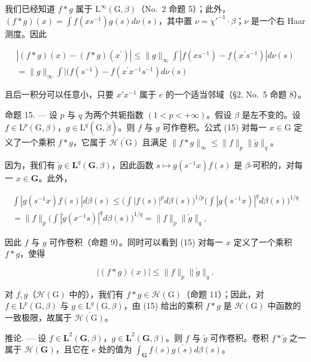 我们已经知道 \(f * g\) 属于 \(\mathrm{L}^{\infty}(\mathrm{G},\beta)\)（No.~2 命题 5）；此外，\((f*g)(x) = \int f(xs^{-1})g(s)d\nu(s)\)，其中置 \(\nu = \chi'^{-1}\cdot \beta\)；\(\nu\) 是一个右 Haar 测度。因此

\[
\begin{array}{c} | (f * g) (x) - (f * g) (x ^ {\prime}) | \leqslant \| g \| _ {\infty} \int | f (x s ^ {- 1}) - f (x ^ {\prime} s ^ {- 1}) | d \nu (s) \\ = \| g \| _ {\infty} \int | (f (s ^ {- 1}) - f (x ^ {\prime} x ^ {- 1} s ^ {- 1}) d \nu (s) \end{array}
\]

且后一积分可以任意小，只要 \(x'x^{-1}\) 属于 \(e\) 的一个适当邻域（§2, No.~5 命题 8）。

命题 15. --- 设 \(p\) 与 \(q\) 为两个共轭指数 \((1 < p < +\infty)\)。假设 \(\beta\) 是左不变的。设 \(f \in \mathrm{L}^p(\mathrm{G}, \beta)\)，\(g \in \mathrm{L}^q(\mathrm{G}, \breve{\beta})\)。则 \(f\) 与 \(g\) 可作卷积。公式 (15) 对每一 \(x \in \mathrm{G}\) 定义了一个乘积 \(f * g\)，它属于 \(\overline{\mathcal{H}(\mathrm{G})}\) 且满足 \(\| f * g \|_{\infty} \leqslant \| f \|_p \| \breve{g} \|_q\)。

因为，我们有 \(\check{g} \in \mathbf{L}^q(\mathbf{G}, \beta)\)，因此函数 \(s \mapsto g(s^{-1}x)f(s)\) 是 \(\beta\)-可积的，对每一 \(x \in \mathbf{G}\)。此外，

\[
\begin{array}{c} \int | g (s ^ {- 1} x) f (s) | d \beta (s) \leqslant \bigg (\int | f (s) | ^ {p} d \beta (s) \bigg) ^ {1 / p} \bigg (\int | g (s ^ {- 1} x) | ^ {q} d \beta (s) \bigg) ^ {1 / q} \\ = \| f \| _ {p} \bigg (\int | \check {g} (x ^ {- 1} s) | ^ {q} d \beta (s) \bigg) ^ {1 / q} = \| f \| _ {p} \| \check {g} \| _ {q}, \end{array}
\]

因此 \(f\) 与 \(g\) 可作卷积（命题 9）。同时可以看到 (15) 对每一 \(x\) 定义了一个乘积 \(f * g\)，使得

\[
\left| (f * g) (x) \right| \leqslant \| f \| _ {p} \| \check {g} \| _ {q}.
\]

对 \(f, g\)（\(\mathcal{H}(\mathrm{G})\) 中的），我们有 \(f * g \in \mathcal{H}(\mathrm{G})\)（命题 11）；因此，对 \(f \in \mathrm{L}^p(\mathrm{G}, \beta)\) 与 \(g \in \mathrm{L}^q(\mathrm{G}, \beta)\)，由 (15) 给出的乘积 \(f * g\) 是 \(\mathcal{H}(\mathrm{G})\) 中函数的一致极限，故属于 \(\overline{\mathcal{H}(\mathrm{G})}\)。

推论. --- 设 \(f \in \mathbf{L}^2(\mathbf{G}, \beta)\)，\(g \in \mathbf{L}^2(\mathbf{G}, \beta)\)。则 \(f\) 与 \(\breve{g}\) 可作卷积。卷积 \(f * \breve{g}\) 之一属于 \(\overline{\mathcal{H}(\mathbf{G})}\)，且它在 \(e\) 处的值为 \(\int_{\mathbf{G}} f(s) \overline{g(s)} d\beta(s)\)。

